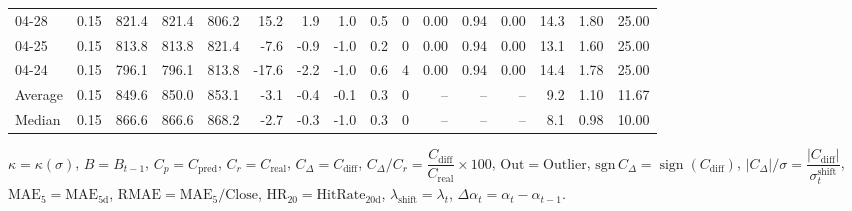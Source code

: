 \begin{threeparttable}
{\begin{tabular}{lrrrrrrrrrrrrrrr}
  04-28 &     0.15 & 821.4 & 821.4 & 806.2 &       15.2 &            1.9 &                      1.0 &                 0.5 &              0 &       0.00 &      0.94 &           0.00 &             14.3 &            1.80 &                  25.00 \\
  04-25 &     0.15 & 813.8 & 813.8 & 821.4 &       -7.6 &           -0.9 &                     -1.0 &                 0.2 &              0 &       0.00 &      0.94 &           0.00 &             13.1 &            1.60 &                  25.00 \\
  04-24 &     0.15 & 796.1 & 796.1 & 813.8 &      -17.6 &           -2.2 &                     -1.0 &                 0.6 &              4 &       0.00 &      0.94 &           0.00 &             14.4 &            1.78 &                  25.00 \\
Average &     0.15 & 849.6 & 850.0 & 853.1 &       -3.1 &           -0.4 &                     -0.1 &                 0.3 &              0 &         -- &        -- &             -- &              9.2 &            1.10 &                  11.67 \\
 Median &     0.15 & 866.6 & 866.6 & 868.2 &       -2.7 &           -0.3 &                     -1.0 &                 0.3 &              0 &         -- &        -- &             -- &              8.1 &            0.98 &                  10.00 \\
\bottomrule
\end{tabular}
}
\begin{tablenotes}\footnotesize
\item $\kappa=\kappa(\sigma)$, $B=B_{t-1}$, $C_p=C_{\text{pred}}$, $C_r=C_{\text{real}}$, $C_\Delta=C_{\text{diff}}$, $C_\Delta/C_r=\dfrac{C_{\text{diff}}}{C_{\text{real}}}\times100$, $\mathrm{Out}=\text{Outlier}$, $\mathrm{sgn}\,C_\Delta=\operatorname{sign}(C_{\text{diff}})$, $|C_\Delta|/\sigma=\dfrac{|C_{\text{diff}}|}{\sigma_t^{\text{shift}}}$, $\mathrm{MAE}_5=\mathrm{MAE}_{5\text{d}}$, $\mathrm{RMAE}= \mathrm{MAE}_5 / \text{Close}$, $\mathrm{HR}_{20}=\mathrm{HitRate}_{20\text{d}}$, 
$\lambda_{\text{shift}}=\lambda_t$, 
$\Delta\alpha_t=\alpha_t-\alpha_{t-1}$.
\end{tablenotes}
\end{threeparttable}
\endgroup

